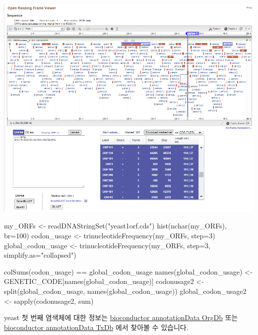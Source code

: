 \documentclass[
]{book}
\newenvironment{Shaded}{\begin{snugshade}}{\end{snugshade}}
\newcommand{\AttributeTok}[1]{\textcolor[rgb]{0.77,0.63,0.00}{#1}}
\newcommand{\DecValTok}[1]{\textcolor[rgb]{0.00,0.00,0.81}{#1}}
\newcommand{\FunctionTok}[1]{\textcolor[rgb]{0.00,0.00,0.00}{#1}}
\newcommand{\NormalTok}[1]{#1}
\newcommand{\OtherTok}[1]{\textcolor[rgb]{0.56,0.35,0.01}{#1}}
\newcommand{\SpecialCharTok}[1]{\textcolor[rgb]{0.00,0.00,0.00}{#1}}
\newcommand{\StringTok}[1]{\textcolor[rgb]{0.31,0.60,0.02}{#1}}
\begin{document}
\includegraphics{images/orffinder.PNG}

\begin{Shaded}
\begin{Highlighting}[]
\NormalTok{my\_ORFs }\OtherTok{\textless{}{-}} \FunctionTok{readDNAStringSet}\NormalTok{(}\StringTok{"yeast1orf.cds"}\NormalTok{)}
\FunctionTok{hist}\NormalTok{(}\FunctionTok{nchar}\NormalTok{(my\_ORFs), }\AttributeTok{br=}\DecValTok{100}\NormalTok{)}
\NormalTok{codon\_usage }\OtherTok{\textless{}{-}} \FunctionTok{trinucleotideFrequency}\NormalTok{(my\_ORFs, }\AttributeTok{step=}\DecValTok{3}\NormalTok{)}
\NormalTok{global\_codon\_usage }\OtherTok{\textless{}{-}} \FunctionTok{trinucleotideFrequency}\NormalTok{(my\_ORFs, }\AttributeTok{step=}\DecValTok{3}\NormalTok{, }\AttributeTok{simplify.as=}\StringTok{"collapsed"}\NormalTok{)}

\FunctionTok{colSums}\NormalTok{(codon\_usage) }\SpecialCharTok{==}\NormalTok{ global\_codon\_usage}
\FunctionTok{names}\NormalTok{(global\_codon\_usage) }\OtherTok{\textless{}{-}}\NormalTok{ GENETIC\_CODE[}\FunctionTok{names}\NormalTok{(global\_codon\_usage)]}
\NormalTok{codonusage2 }\OtherTok{\textless{}{-}} \FunctionTok{split}\NormalTok{(global\_codon\_usage, }\FunctionTok{names}\NormalTok{(global\_codon\_usage))}
\NormalTok{global\_codon\_usage2 }\OtherTok{\textless{}{-}} \FunctionTok{sapply}\NormalTok{(codonusage2, sum) }
\end{Highlighting}
\end{Shaded}

yeast 첫 번째 염색체에 대한 정보는 \href{http://bioconductor.org/packages/release/BiocViews.html\#___OrgDb}{bioconductor annotationData OrgDb} 또는 \href{https://www.bioconductor.org/packages/release/BiocViews.html\#___TxDb}{bioconductor annotationData TxDb} 에서 찾아볼 수 있습니다.
\end{document}
